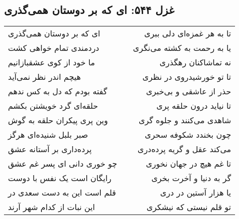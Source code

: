 \begin{center}
\section*{غزل ۵۴۴: ای که بر دوستان همی‌گذری}
\label{sec:544}
\begin{longtable}{l p{0.5cm} r}
ای که بر دوستان همی‌گذری
&&
تا به هر غمزه‌ای دلی ببری
\\
دردمندی تمام خواهی کشت
&&
یا به رحمت به کشته می‌نگری
\\
ما خود از کوی عشقبازانیم
&&
نه تماشاکنان رهگذری
\\
هیچم اندر نظر نمی‌آید
&&
تا تو خورشیدروی در نظری
\\
گفته بودم که دل به کس ندهم
&&
حذر از عاشقی و بی‌خبری
\\
حلقه‌ای گرد خویشتن بکشم
&&
تا نیاید درون حلقه پری
\\
وین پری پیکران حلقه به گوش
&&
شاهدی می‌کنند و جلوه گری
\\
صبر بلبل شنیده‌ای هرگز
&&
چون بخندد شکوفه سحری
\\
پرده‌داری بر آستانه عشق
&&
می‌کند عقل و گریه پرده‌دری
\\
چو خوری دانی ای پسر غم عشق
&&
تا غم هیچ در جهان نخوری
\\
رایگان است یک نفس با دوست
&&
گر به دنیا و آخرت بخری
\\
قلم است این به دست سعدی در
&&
یا هزار آستین در دری
\\
این نبات از کدام شهر آرند
&&
تو قلم نیستی که نیشکری
\\
\end{longtable}
\end{center}
